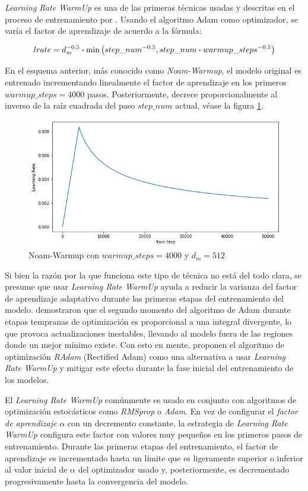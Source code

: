 \textit{Learning Rate WarmUp} es una de las primeras técnicas usadas y descritas en el proceso de
entrenamiento por \citeauthor{Vaswani}. Usando el algoritmo Adam como optimizador, se varía el factor
de aprendizaje de acuerdo a la fórmula:


\begin{equation}
    lrate = d_{m}^{-0.5} \vdot \min\big(step\_num^{-0.5}, step\_num \vdot warmup\_steps^{-0.5} \big)
\end{equation}

En el esquema anterior, más conocido como \textit{Noam-Warmup}, el modelo original es entrenado
incrementando linealmente el factor de aprendizaje en los primeros $warmup\_steps=4000$ pasos.
Posteriormente, decrece proporcionalmente al inverso de la raíz cuadrada del paso $step\_num$
actual, véase la figura \ref{fig:noam}.

\begin{figure}[ht!]
    \centering
    \includegraphics[width=0.5 \textwidth]{Chapters/2. Transformer/Figures/transformer/noam.png}
    \caption{Noam-Warmup con $warmup\_steps=4000$ y $d_{m} = 512$}
    \label{fig:noam}
\end{figure}

Si bien la razón por la que funciona este tipo de técnica no está del todo clara, se presume que usar
\textit{Learning Rate WarmUp} ayuda a reducir la varianza del factor de aprendizaje adaptativo durante
las primeras etapas del entrenamiento del modelo. \citeauthor{DBLP:journals/corr/abs-1908-03265}
demostraron que el segundo momento del algoritmo de Adam durante etapas tempranas de optimización es
proporcional a una integral divergente, lo que provoca actualizaciones inestables, llevando al modelo
fuera de las regiones donde un mejor mínimo existe. Con esto en mente, \citeauthor{DBLP:journals/corr/abs-1908-03265}
proponen el algoritmo de optimización \textit{RAdam} (Rectified Adam) como una alternativa a usar
\textit{Learning Rate WarmUp} y mitigar este efecto durante la fase inicial del entrenamiento de los modelos.

El \textit{Learning Rate WarmUp} comúnmente es usado en conjunto con algoritmos de optimización
estocásticos como \textit{RMSprop} o \textit{Adam}. En vez de configurar el \textit{factor de
aprendizaje} $\alpha$ con un decremento constante, la estrategia de \textit{Learning Rate WarmUp}
configura este factor con valores muy pequeños en los primeros pasos de entrenamiento. Durante las
primeras etapas del entrenamiento, el factor de aprendizaje es incrementado hasta un límite que es
ligeramente superior o inferior al valor inicial de $\alpha$ del optimizador usado y, posteriormente,
es decrementado progresivamente hasta la convergencia del modelo.

